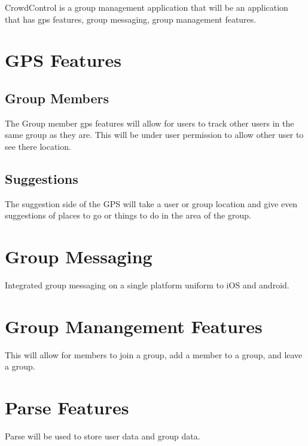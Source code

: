 



CrowdControl is a group management application that will be an application that has gps features, group messaging, group management features.

\section{GPS Features}

\subsection{Group Members}

The Group member gps features will allow for users to track other users in the same group as they are. This will be under user permission to allow other user to see there location.

\subsection{Suggestions}

The suggestion side of the GPS will take a user or group location and give even suggestions of places to go or things to do in the area of the group.

\section{Group Messaging}

Integrated group messaging on a single platform uniform to iOS and android. 

\section{Group Manangement Features}

This will allow for members to join a group, add a member to a group, and leave a group.

\section{Parse Features}

Parse will be used to store user data and group data.
